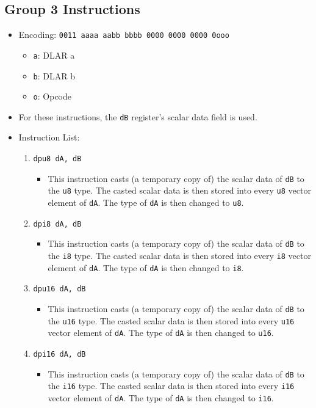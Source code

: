 \documentclass{article}
\begin{document}
	\subsection{Group 3 Instructions}
		\begin{itemize}
		\item Encoding: \texttt{0011 aaaa aabb bbbb  0000 0000 0000 0ooo}
			\begin{itemize}
			\item \texttt{a}:  DLAR a
			\item \texttt{b}:  DLAR b
			\item \texttt{o}:  Opcode
			\end{itemize}

		\item For these instructions, the \texttt{dB} register's scalar
		data field is used.

		\item Instruction List:
			\begin{enumerate}
			\item \texttt{dpu8 dA, dB}
				\begin{itemize}
				\item This instruction casts (a temporary copy of) the
				scalar data of \texttt{dB} to the \texttt{u8} type.  The
				casted scalar data is then stored into every \texttt{u8}
				vector element of \texttt{dA}.  The type of \texttt{dA} is
				then changed to \texttt{u8}.
				\end{itemize}
			\item \texttt{dpi8 dA, dB}
				\begin{itemize}
				\item This instruction casts (a temporary copy of) the
				scalar data of \texttt{dB} to the \texttt{i8} type.  The
				casted scalar data is then stored into every \texttt{i8}
				vector element of \texttt{dA}.  The type of \texttt{dA} is
				then changed to \texttt{i8}.
				\end{itemize}
			\item \texttt{dpu16 dA, dB}
				\begin{itemize}
				\item This instruction casts (a temporary copy of) the
				scalar data of \texttt{dB} to the \texttt{u16} type.  The
				casted scalar data is then stored into every \texttt{u16}
				vector element of \texttt{dA}.  The type of \texttt{dA} is
				then changed to \texttt{u16}.
				\end{itemize}
			\item \texttt{dpi16 dA, dB}
				\begin{itemize}
				\item This instruction casts (a temporary copy of) the
				scalar data of \texttt{dB} to the \texttt{i16} type.  The
				casted scalar data is then stored into every \texttt{i16}
				vector element of \texttt{dA}.  The type of \texttt{dA} is
				then changed to \texttt{i16}.
				\end{itemize}


\end{enumerate}
\end{itemize}
\end{document}
